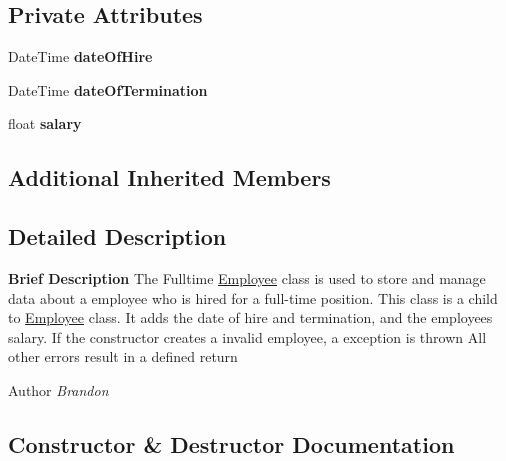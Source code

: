 \subsection*{Private Attributes}
\begin{DoxyCompactItemize}
\item 
\hypertarget{class_all_employees_1_1_fulltime_employee_aa072bd7c652567684c77e0cfd6638af2}{}Date\+Time {\bfseries date\+Of\+Hire}\label{class_all_employees_1_1_fulltime_employee_aa072bd7c652567684c77e0cfd6638af2}

\item 
\hypertarget{class_all_employees_1_1_fulltime_employee_a3836c1a3f74f71f87652c91913eb570c}{}Date\+Time {\bfseries date\+Of\+Termination}\label{class_all_employees_1_1_fulltime_employee_a3836c1a3f74f71f87652c91913eb570c}

\item 
\hypertarget{class_all_employees_1_1_fulltime_employee_afd766110662d0321998cecb84d0dd425}{}float {\bfseries salary}\label{class_all_employees_1_1_fulltime_employee_afd766110662d0321998cecb84d0dd425}

\end{DoxyCompactItemize}
\subsection*{Additional Inherited Members}


\subsection{Detailed Description}
{\bfseries Brief Description} The Fulltime \hyperlink{class_all_employees_1_1_employee}{Employee} class is used to store and manage data about a employee who is hired for a full-\/time position. This class is a child to \hyperlink{class_all_employees_1_1_employee}{Employee} class. It adds the date of hire and termination, and the employees salary. If the constructor creates a invalid employee, a exception is thrown All other errors result in a defined return 

\begin{DoxyAuthor}{Author}
{\itshape Brandon} 
\end{DoxyAuthor}


\subsection{Constructor \& Destructor Documentation}
\hypertarget{class_all_employees_1_1_fulltime_employee_a2f7744fed20aa3161c5ac5cd37c1a281}{}
